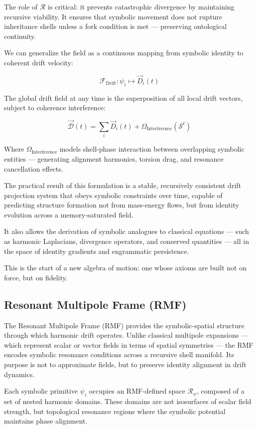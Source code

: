 \documentclass[12pt]{article}
\begin{document}
The role of \( \mathcal{R} \) is critical: it prevents catastrophic divergence by maintaining recursive viability. It ensures that symbolic movement does not rupture inheritance shells unless a fork condition is met — preserving ontological continuity.

We can generalize the field as a continuous mapping from symbolic identity to coherent drift velocity:

\[
\mathcal{F}_{\text{Drift}} : \psi_i \mapsto \vec{D}_i(t)
\]

The global drift field at any time is the superposition of all local drift vectors, subject to coherence interference:

\[
\vec{\mathcal{D}}(t) = \sum_i \vec{D}_i(t) + \Omega_{\text{Interference}}(\mathcal{S}^\ell)
\]

Where \( \Omega_{\text{Interference}} \) models shell-phase interaction between overlapping symbolic entities — generating alignment harmonics, torsion drag, and resonance cancellation effects.

The practical result of this formulation is a stable, recursively consistent drift projection system that obeys symbolic constraints over time, capable of predicting structure formation not from mass-energy flows, but from identity evolution across a memory-saturated field.

It also allows the derivation of symbolic analogues to classical equations — such as harmonic Laplacians, divergence operators, and conserved quantities — all in the space of identity gradients and engrammatic persistence.

This is the start of a new algebra of motion: one whose axioms are built not on force, but on fidelity.

\subsection{Resonant Multipole Frame (RMF)}

The Resonant Multipole Frame (RMF) provides the symbolic-spatial structure through which harmonic drift operates. Unlike classical multipole expansions — which represent scalar or vector fields in terms of spatial symmetries — the RMF encodes symbolic resonance conditions across a recursive shell manifold. Its purpose is not to approximate fields, but to preserve identity alignment in drift dynamics.

Each symbolic primitive \( \psi_i \) occupies an RMF-defined space \( \mathcal{R}_\psi \), composed of a set of nested harmonic domains. These domains are not isosurfaces of scalar field strength, but topological resonance regions where the symbolic potential maintains phase alignment.
\end{document}
